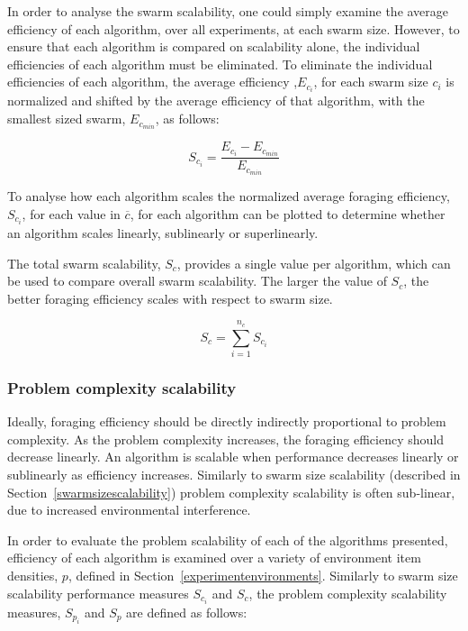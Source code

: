 In order to analyse the swarm scalability, one could simply examine the average efficiency of each algorithm, over all experiments, at each swarm size. However, to ensure that each algorithm is compared on scalability alone, the individual efficiencies of each algorithm must be eliminated. To eliminate the individual efficiencies of each algorithm, the average efficiency  ,$E_{c_i}$, for each swarm size $c_i$ is normalized and shifted by the average efficiency of that algorithm, with the smallest sized swarm, $E_{c_{min}}$, as follows: 

\begin{equation}
S_{c_i} = \dfrac{E_{c_{i}} - E_{c_{min}}}{E_{c_{min}}}
\end{equation}


To analyse how each algorithm scales the normalized average foraging efficiency, $S_{c_i}$, for each value in $\overline{c}$, for each algorithm can be plotted to determine whether an algorithm scales linearly, sublinearly or superlinearly. 

The total swarm scalability, $S_c$, provides a single value per algorithm, which can be used to compare overall swarm scalability. The larger the value of $S_c$, the better foraging efficiency scales with respect to swarm size. 

\begin{equation}
	S_c = \sum_{i=1}^{n_c} S_{c_i}
\end{equation}


\subsubsection{Problem complexity scalability}
\label{setup:problemscalability}

Ideally, foraging efficiency should be directly indirectly proportional to problem complexity. As the problem complexity increases, the foraging efficiency should decrease linearly. An algorithm is scalable when performance decreases linearly or sublinearly as efficiency increases. Similarly to swarm size scalability (described in Section~\ref{swarmsizescalability}) problem complexity scalability is often sub-linear, due to increased environmental interference. 

In order to evaluate the problem scalability of each of the algorithms presented, efficiency of each algorithm is examined over a variety of environment item densities, $p$, defined in Section~\ref{experimentenvironments}. Similarly to swarm size scalability performance measures $S_{c_i}$ and $S_c$, the problem complexity scalability measures, $S_{p_i}$ and $S_p$ are defined as follows:

